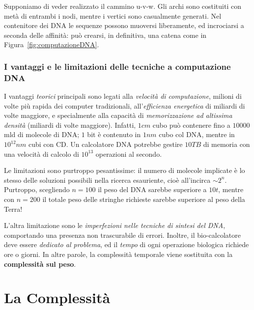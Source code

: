 \documentclass[10pt]{\classname}
\theoremstyle{newlinethm}
\theoremstyle{theorem}
\theoremstyle{definition}
\theoremstyle{definition}
\theoremstyle{definition}
\theoremstyle{definition}
\begin{document}
Supponiamo di veder realizzato il cammino u-v-w. Gli archi sono costituiti con
metà di entrambi i nodi, mentre i vertici sono casualmente generati. Nel
contenitore dei DNA le sequenze possono muoversi liberamente, ed incrociarsi a
seconda delle affinità: può crearsi, in definitiva, una catena come in
Figura~\ref{fig:computazioneDNA}.

\subsection{I vantaggi e le limitazioni delle tecniche a computazione DNA}

I vantaggi \emph{teorici} principali sono legati alla \emph{velocità di
computazione}, milioni di volte più rapida dei computer tradizionali,
all'\emph{efficienza energetica} di miliardi di volte maggiore, e specialmente
alla capacità di \emph{memorizzazione ad altissima densità} (miliardi di
volte maggiore). Infatti, $1cm$ cubo può contenere fino a $10000$ mld di
molecole di DNA; $1$ bit è contenuto in $1nm$ cubo col DNA, mentre in $10^{12}nm$
cubi con CD. Un calcolatore DNA potrebbe gestire $10TB$ di memoria con una
velocità di calcolo di $10^{13}$ operazioni al secondo.

Le limitazioni sono purtroppo pesantissime: il numero di molecole implicate è
lo stesso delle soluzioni possibili nella ricerca esauriente, cioè all'incirca
$\sim 2^n$. Purtroppo, scegliendo $n=100$ il peso del DNA sarebbe superiore a
$10t$, mentre con $n=200$ il totale peso delle stringhe richieste sarebbe
superiore al peso della Terra!

L'altra limitazione sono le \emph{imperfezioni nelle tecniche di sintesi del
DNA}, comportando una presenza non trascurabile di errori. Inoltre, il
bio-calcolatore deve essere \emph{dedicato al problema}, ed il \emph{tempo} di
ogni operazione biologica richiede ore o giorni. In altre parole, la
complessità temporale viene sostituita con la \textbf{complessità sul peso}.

\chapter{La Complessità}
\end{document}
